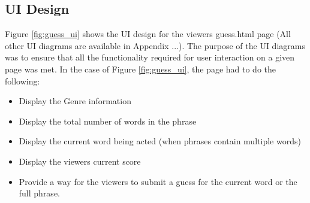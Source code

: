 \newpage

\subsection{UI Design}
\begin{figure}[h!]
\end{figure}

Figure \ref{fig:guess_ui} shows the UI design for the viewers guess.html page (All other UI diagrams are available in Appendix ...). The purpose of the UI diagrams was to ensure that all the functionality required for user interaction on a given page was met. In the case of Figure \ref{fig:guess_ui}, the page had to do the following:
\begin{itemize}
	\item Display the Genre information
	
	\item Display the total number of words in the phrase
	
	\item Display the current word being acted (when phrases contain multiple words)
	
	\item Display the viewers current score
	
	\item Provide a way for the viewers to submit a guess for the current word or the full phrase.
\end{itemize}

